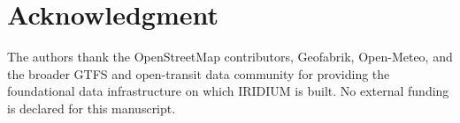 \section*{Acknowledgment}
The authors thank the OpenStreetMap contributors, Geofabrik, Open-Meteo,
and the broader GTFS and open-transit data community for providing the
foundational data infrastructure on which IRIDIUM is built.
No external funding is declared for this manuscript.
